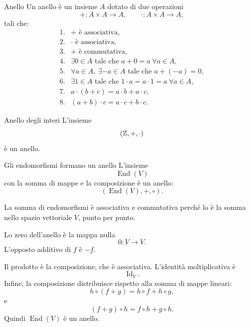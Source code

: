 \documentclass[a4paper]{article}
\begin{document}
\begin{snippetdefinition}{Anello}
    Un anello è un insieme \(A\) dotato di due operazioni
    \[
        + : A\times A\to A,
        \qquad
        \cdot : A\times A\to A,
    \]
    tali che:
    \[
        \begin{array}{ll}
            \text{1.} & + \text{ è associativa},\\
            \text{2.} & \cdot \text{ è associativa},\\
            \text{3.} & + \text{ è commutativa},\\
            \text{4.} & \exists 0\in A \text{ tale che } a+0=a \ \forall a\in A,\\
            \text{5.} & \forall a\in A,\ \exists -a\in A \text{ tale che } a+(-a)=0,\\
            \text{6.} & \exists 1\in A \text{ tale che } 1\cdot a=a\cdot 1=a \ \forall a\in A,\\
            \text{7.} & a\cdot(b+c)=a\cdot b+a\cdot c,\\
            \text{8.} & (a+b)\cdot c=a\cdot c+b\cdot c.
        \end{array}
    \]
\end{snippetdefinition}

\begin{snippetexample}{Anello degli interi}
    L'insieme
    \[
        (\mathbb{Z},+,\cdot)
    \]
    è un anello.
\end{snippetexample}

\begin{snippetproposition}{Gli endomorfismi formano un anello}
    L'insieme
    \[
        \operatorname{End}(V)
    \]
    con la somma di mappe e la composizione è un anello:
    \[
        (\operatorname{End}(V),+,\circ).
    \]
\end{snippetproposition}

\begin{snippetproof}{}
    La somma di endomorfismi è associativa e commutativa perché lo è la somma nello spazio vettoriale \(V\), punto per punto.

    Lo zero dell'anello è la mappa nulla
    \[
        0:V\to V.
    \]
    L'opposto additivo di \(f\) è \(-f\).

    Il prodotto è la composizione, che è associativa. L'identità moltiplicativa è
    \[
        \operatorname{Id}_V.
    \]
    Infine, la composizione distribuisce rispetto alla somma di mappe lineari:
    \[
        h\circ(f+g)=h\circ f+h\circ g,
    \]
    e
    \[
        (f+g)\circ h=f\circ h+g\circ h.
    \]
    Quindi \(\operatorname{End}(V)\) è un anello.
\end{snippetproof}
\end{document}
